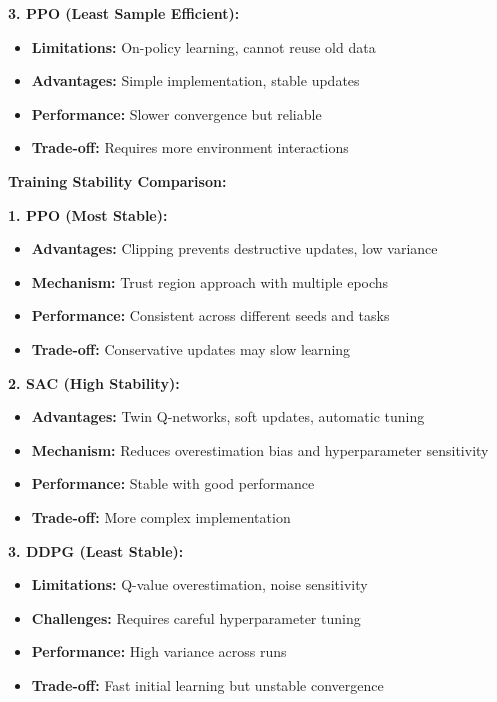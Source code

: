 \documentclass[12pt]{article}
\begin{document}
{{{\textbf{3. PPO (Least Sample Efficient):}
\begin{itemize}
    \item \textbf{Limitations:} On-policy learning, cannot reuse old data
    \item \textbf{Advantages:} Simple implementation, stable updates
    \item \textbf{Performance:} Slower convergence but reliable
    \item \textbf{Trade-off:} Requires more environment interactions
\end{itemize}

\textbf{Training Stability Comparison:}

\textbf{1. PPO (Most Stable):}
\begin{itemize}
    \item \textbf{Advantages:} Clipping prevents destructive updates, low variance
    \item \textbf{Mechanism:} Trust region approach with multiple epochs
    \item \textbf{Performance:} Consistent across different seeds and tasks
    \item \textbf{Trade-off:} Conservative updates may slow learning
\end{itemize}

\textbf{2. SAC (High Stability):}
\begin{itemize}
    \item \textbf{Advantages:} Twin Q-networks, soft updates, automatic tuning
    \item \textbf{Mechanism:} Reduces overestimation bias and hyperparameter sensitivity
    \item \textbf{Performance:} Stable with good performance
    \item \textbf{Trade-off:} More complex implementation
\end{itemize}

\textbf{3. DDPG (Least Stable):}
\begin{itemize}
    \item \textbf{Limitations:} Q-value overestimation, noise sensitivity
    \item \textbf{Challenges:} Requires careful hyperparameter tuning
    \item \textbf{Performance:} High variance across runs
    \item \textbf{Trade-off:} Fast initial learning but unstable convergence
\end{itemize}

}}}
\end{document}
